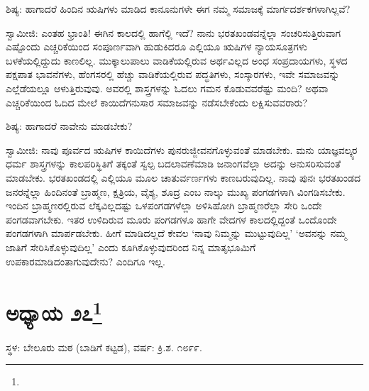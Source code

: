 ಶಿಷ್ಯ: ಹಾಗಾದರೆ ಹಿಂದಿನ ಋಷಿಗಳು ಮಾಡಿದ ಕಾನೂನುಗಳೇ ಈಗ ನಮ್ಮ ಸಮಾಜಕ್ಕೆ ಮಾರ್ಗದರ್ಶಕಗಳಾಗಿಲ್ಲವೆ?

ಸ್ವಾಮೀಜಿ: ಎಂತಹ ಭ್ರಾಂತಿ! ಈಗಿನ ಕಾಲದಲ್ಲಿ ಹಾಗೆಲ್ಲಿ ಇದೆ? ನಾನು ಭರತಖಂಡವನ್ನೆಲ್ಲಾ ಸಂಚರಿಸುತ್ತಿರುವಾಗ ಎಷ್ಟೊಂದು ಎಚ್ಚರಿಕೆಯಿಂದ ಸಂಪೂರ್ಣವಾಗಿ ಹುಡುಕಿದರೂ ಎಲ್ಲಿಯೂ ಋಷಿಗಳ ನ್ಯಾಯಸೂತ್ರಗಳು ಬಳಕೆಯಲ್ಲಿದ್ದುದು ಕಾಣಲಿಲ್ಲ. ಮುಕ್ಕಾಲುಪಾಲು ವಾಡಿಕೆಯಲ್ಲಿರುವ ಅರ್ಥವಿಲ್ಲದ ಅಂಧ ಸಂಪ್ರದಾಯಗಳು, ಸ್ಥಳದ ಪಕ್ಷಪಾತ ಭಾವನೆಗಳು, ಹೆಂಗಸರಲ್ಲಿ ಹೆಚ್ಚು ವಾಡಿಕೆಯಲ್ಲಿರುವ ಪದ್ಧತಿಗಳು, ಸಂಸ್ಕಾರಗಳು, ಇವೇ ಸಮಾಜವನ್ನು ಎಲ್ಲೆಡೆಯಲ್ಲೂ ಆಳುತ್ತಿರುವುವು. ಅವರಲ್ಲಿ ಶಾಸ್ತ್ರಗಳನ್ನು ಓದಲು ಗಮನ ಕೊಡುವವರೆಷ್ಟು ಮಂದಿ? ಅಥವಾ ಎಚ್ಚರಿಕೆಯಿಂದ ಓದಿದ ಮೇಲೆ ಕಾಯಿದೆಗನುಸಾರ ಸಮಾಜವನ್ನು ನಡೆಸಬೇಕೆಂದು ಲಕ್ಷಿಸುವವರಾರು?

ಶಿಷ್ಯ: ಹಾಗಾದರೆ ನಾವೇನು ಮಾಡಬೇಕು?

ಸ್ವಾಮೀಜಿ: ನಾವು ಪೂರ್ವದ ಋಷಿಗಳ ಕಾಯಿದೆಗಳು ಪುನರುಜ್ಜೀವನಗೊಳ್ಳುವಂತೆ ಮಾಡಬೇಕು. ಮನು ಯಾಜ್ಞವಲ್ಕ್ಯರ ಧರ್ಮ ಶಾಸ್ತ್ರಗಳನ್ನು ಕಾಲಪರಿಸ್ಥಿತಿಗೆ ತಕ್ಕಂತೆ ಸ್ವಲ್ಪ ಬದಲಾವಣೆಮಾಡಿ ಜನಾಂಗವೆಲ್ಲಾ ಅದನ್ನು ಅನುಸರಿಸುವಂತೆ ಮಾಡಬೇಕು. ಭರತಖಂಡದಲ್ಲಿ ಎಲ್ಲಿಯೂ ಮೂಲ ಚಾತುರ್ವರ್ಣಗಳು ಕಾಣಬರುವುದಿಲ್ಲ. ನಾವು ಪುನಃ ಭರತಖಂಡದ ಜನರನ್ನೆಲ್ಲಾ ಹಿಂದಿನಂತೆ ಬ್ರಾಹ್ಮಣ, ಕ್ಷತ್ರಿಯ, ವೈಶ್ಯ, ಶೂದ್ರ ಎಂಬ ನಾಲ್ಕು ಮುಖ್ಯ ಪಂಗಡಗಳಾಗಿ ವಿಂಗಡಿಸಬೇಕು. ಇಂದಿನ ಬ್ರಾಹ್ಮಣರಲ್ಲಿರುವ ಲೆಕ್ಕವಿಲ್ಲದಷ್ಟು ಒಳಪಂಗಡಗಳೆಲ್ಲಾ ಅಳಿಸಿಹೋಗಿ ಬ್ರಾಹ್ಮಣರೆಲ್ಲಾ ಸೇರಿ ಒಂದೇ ಪಂಗಡವಾಗಬೇಕು. ಇತರ ಉಳಿದಿರುವ ಮೂರು ಪಂಗಡಗಳೂ ಹಾಗೇ ವೇದಗಳ ಕಾಲದಲ್ಲಿದ್ದಂತೆ ಒಂದೊಂದೇ ಪಂಗಡಗಳಾಗಿ ಮಾರ್ಪಡಬೇಕು. ಹೀಗೆ ಮಾಡಿದಲ್ಲದೆ ಕೇವಲ ‘ನಾವು ನಿಮ್ಮನ್ನು ಮುಟ್ಟುವುದಿಲ್ಲ’ ‘ಅವನನ್ನು ನಮ್ಮ ಜಾತಿಗೆ ಸೇರಿಸಿಕೊಳ್ಳುವುದಿಲ್ಲ’ ಎಂದು ಕೂಗಿಕೊಳ್ಳುವುದರಿಂದ ನಿನ್ನ ಮಾತೃಭೂಮಿಗೆ ಉಪಕಾರಮಾಡಿದಂತಾಗುವುದೇನು? ಎಂದಿಗೂ ಇಲ್ಲ.

\newpage

\chapter[ಅಧ್ಯಾಯ ೨೭]{ಅಧ್ಯಾಯ ೨೭\protect\footnote{}}

\begin{center}
ಸ್ಥಳ: ಬೇಲೂರು ಮಠ (ಬಾಡಿಗೆ ಕಟ್ಟಡ), ವರ್ಷ: ಕ್ರಿ.ಶ. ೧೮೯೯.
\end{center}

